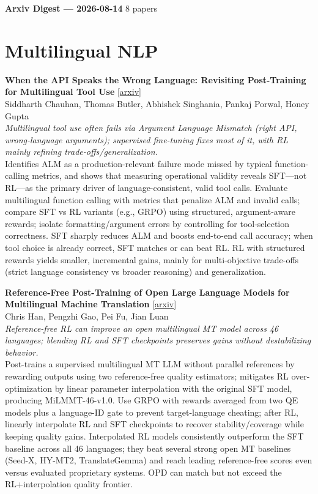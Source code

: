 \documentclass[12pt,letterpaper]{article}
\begin{document}
{\footnotesize\textbf{Arxiv Digest --- 2026-08-14} \hfill 8 papers}

\smallskip

\section*{Multilingual NLP}

{\small\textbf{When the API Speaks the Wrong Language: Revisiting Post-Training for Multilingual Tool Use}} {\scriptsize[\href{https://arxiv.org/abs/2608.11715}{arxiv}]}\\
{\scriptsize Siddharth Chauhan, Thomas Butler, Abhishek Singhania, Pankaj Porwal, Honey Gupta}\\

{\small\textit{Multilingual tool use often fails via Argument Language Mismatch (right API, wrong-language arguments); supervised fine-tuning fixes most of it, with RL mainly refining trade-offs/generalization.}}\\[1pt]
{\footnotesize Identifies ALM as a production-relevant failure mode missed by typical function-calling metrics, and shows that measuring operational validity reveals SFT---not RL---as the primary driver of language-consistent, valid tool calls. Evaluate multilingual function calling with metrics that penalize ALM and invalid calls; compare SFT vs RL variants (e.g., GRPO) using structured, argument-aware rewards; isolate formatting/argument errors by controlling for tool-selection correctness. SFT sharply reduces ALM and boosts end-to-end call accuracy; when tool choice is already correct, SFT matches or can beat RL. RL with structured rewards yields smaller, incremental gains, mainly for multi-objective trade-offs (strict language consistency vs broader reasoning) and generalization.}

\medskip

{\small\textbf{Reference-Free Post-Training of Open Large Language Models for Multilingual Machine Translation}} {\scriptsize[\href{https://arxiv.org/abs/2608.10812}{arxiv}]}\\
{\scriptsize Chris Han, Pengzhi Gao, Pei Fu, Jian Luan}\\

{\small\textit{Reference-free RL can improve an open multilingual MT model across 46 languages; blending RL and SFT checkpoints preserves gains without destabilizing behavior.}}\\[1pt]
{\footnotesize Post-trains a supervised multilingual MT LLM without parallel references by rewarding outputs using two reference-free quality estimators; mitigates RL over-optimization by linear parameter interpolation with the original SFT model, producing MiLMMT-46-v1.0. Use GRPO with rewards averaged from two QE models plus a language-ID gate to prevent target-language cheating; after RL, linearly interpolate RL and SFT checkpoints to recover stability/coverage while keeping quality gains. Interpolated RL models consistently outperform the SFT baseline across all 46 languages; they beat several strong open MT baselines (Seed-X, HY-MT2, TranslateGemma) and reach leading reference-free scores even versus evaluated proprietary systems. OPD can match but not exceed the RL+interpolation quality frontier.}
\end{document}
